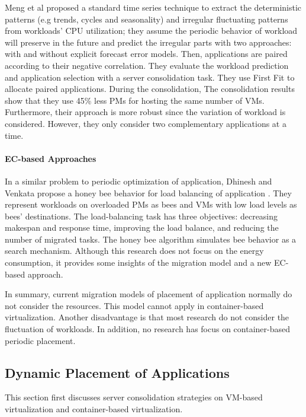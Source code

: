 Meng et al \cite{Meng:2010gh} proposed a standard time series technique to extract the deterministic patterns (e.g trends, cycles and seasonality) and irregular fluctuating patterns from workloads' CPU utilization; they assume the periodic behavior of workload will preserve in the future and predict the irregular parts with two approaches: with and without explicit forecast error models. Then, applications are paired according to their negative correlation. They evaluate the workload prediction and application selection with a server consolidation task. They use First Fit to allocate paired applications. During the consolidation, The consolidation results show that they use 45\% less PMs for hosting the same number of VMs. Furthermore, their approach is more robust since the variation of workload is considered. However, they only consider two complementary applications at a time. 

\paragraph{EC-based Approaches}
In a similar problem to periodic optimization of application, Dhinesh and Venkata propose a honey bee behavior for load balancing  of application \cite{Babu:2013jf}. They represent workloads on overloaded PMs as bees and VMs with low load levels as bees' destinations. The load-balancing task has three objectives: decreasing makespan and response time, improving the load balance, and reducing the number of migrated tasks. The honey bee algorithm simulates bee behavior as a search mechanism. Although this research does not focus on the energy consumption, it provides some insights of the migration model and a new EC-based approach.


\vspace{5mm}

In summary, current migration models of placement of application normally do not consider the resources. This model cannot apply in container-based virtualization. Another disadvantage is that most research do not consider the fluctuation of workloads. In addition, no research has focus on container-based periodic placement. 



\subsection{Dynamic Placement of Applications}
This section first discusses server consolidation strategies on VM-based virtualization and container-based virtualization.

